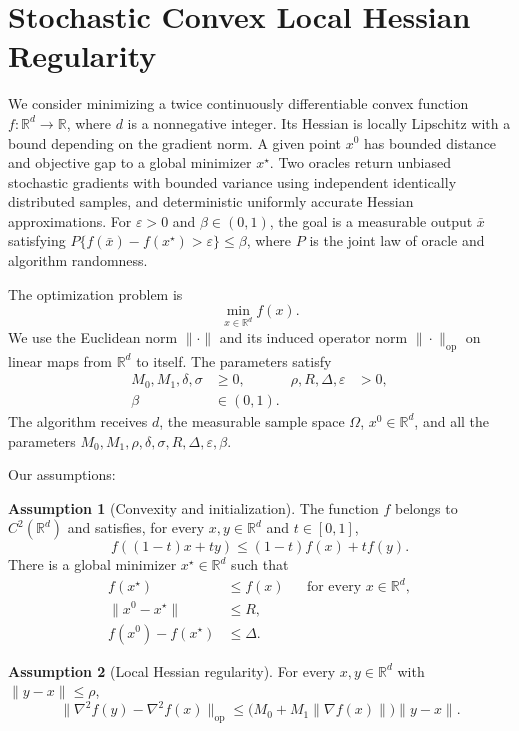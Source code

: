 \documentclass[10pt]{article}
\theoremstyle{definition}
\newtheorem{assumption}{Assumption}
\begin{document}
\section*{Stochastic Convex Local Hessian Regularity}
We consider minimizing a twice continuously differentiable convex function $f:\mathbb{R}^d\to\mathbb{R}$, where $d$ is a nonnegative integer. Its Hessian is locally Lipschitz with a bound depending on the gradient norm. A given point $x^0$ has bounded distance and objective gap to a global minimizer $x^\star$. Two oracles return unbiased stochastic gradients with bounded variance using independent identically distributed samples, and deterministic uniformly accurate Hessian approximations. For $\varepsilon>0$ and $\beta\in(0,1)$, the goal is a measurable output $\bar{x}$ satisfying $P\{f(\bar{x})-f(x^\star)>\varepsilon\}\leq\beta$, where $P$ is the joint law of oracle and algorithm randomness.

The optimization problem is
\[
\min_{x\in\mathbb{R}^d} f(x).
\]
We use the Euclidean norm $\|\cdot\|$ and its induced operator norm $\|\cdot\|_{\mathrm{op}}$ on linear maps from $\mathbb{R}^d$ to itself. The parameters satisfy
\[
\begin{aligned}
M_0,M_1,\delta,\sigma&\geq 0, & \rho,R,\Delta,\varepsilon&>0,\\
\beta&\in(0,1).
\end{aligned}
\]
The algorithm receives $d$, the measurable sample space $\Omega$, $x^0\in\mathbb{R}^d$, and all the parameters $M_0,M_1,\rho,\delta,\sigma,R,\Delta,\varepsilon,\beta$.

Our assumptions:
\begin{assumption}[Convexity and initialization]
The function $f$ belongs to $C^2(\mathbb{R}^d)$ and satisfies, for every $x,y\in\mathbb{R}^d$ and $t\in[0,1]$,
\[
f((1-t)x+ty)\leq(1-t)f(x)+tf(y).
\]
There is a global minimizer $x^\star\in\mathbb{R}^d$ such that
\[
\begin{aligned}
f(x^\star)&\leq f(x) &&\text{for every }x\in\mathbb{R}^d,\\
\|x^0-x^\star\|&\leq R,\\
f(x^0)-f(x^\star)&\leq\Delta.
\end{aligned}
\]
\end{assumption}

\begin{assumption}[Local Hessian regularity]
For every $x,y\in\mathbb{R}^d$ with $\|y-x\|\leq\rho$,
\[
\|\nabla^2 f(y)-\nabla^2 f(x)\|_{\mathrm{op}}
\leq \bigl(M_0+M_1\|\nabla f(x)\|\bigr)\|y-x\|.
\]
\end{assumption}
\end{document}
